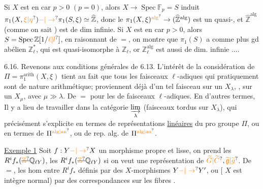 
Si $X$ est en car $p>0$ $(p=0)$, alors $X\to\operatorname{Spec}\mathbb{F}_p=S$ induit   $\pi_1(X,\unsure{\xi|\eta})\unsure{-|\to}\pi_1(S,\xi)\simeq\widehat{\mathbb{Z}}$, donc le $\pi_1(X,\xi)^{\unsure{\mathrm{alg}}}\to(\widehat{\mathbb{Z}}^{\mathrm{alg}})$ est un quasi-, et $\widehat{\mathbb{Z}}^{\mathrm{alg}}$ (comme on sait ) est de dim infinie. Si $X$ est en car $p>0$, alors  $S=\operatorname{Spec}\mathbb{Z}[1/\unsure{\ell|l}]$,  en raisonnant de $=$, on montre que $\pi_1(S)$ a  comme plus gd  abélien $\mathbb{Z}_\ell^*$, qui est quasi-isomorphe à $\mathbb{Z}_\ell$, or $\mathbb{Z}_\ell^{\mathrm{alg}}$ est aussi de dim. infinie ....

6.16. Revenons aux conditions générales de 6.13. L'intérêt de la considération de \deleted{\unsure{\(\Pi\)}} $\Pi=\pi_1^{\mathrm{arith}}(X,\xi)$ tient au fait que tous les faisceaux $\ell$-adiques  qui  pratiquement sont de nature arithmétique;  proviennent déjà d'un tel faisceau sur un $X_\lambda$,  , sur un $X_\mu$, avec $\mu\gg\lambda$.  De $=$ pour les  de faisceaux $\ell$-adiques. En d'autres termes,
Il y a lieu de travailler dans la catégorie $\underset{\lambda}{\varinjlim}$ (faisceaux  tordus sur $X_\lambda$), qui précisément s'explicite en termes de représentations \uline{linéaires}  du pro groupe $\Pi$, ou en termes de $\Pi^{\unsure{\mathrm{alg}|\mathrm{an}}}$, ou de rep. alg. de $\Pi^{\unsure{\mathrm{alg}|\mathrm{an}}}$.

\uline{Exemple 1} Soit $f:Y\unsure{-|\to}X$ un morphisme propre et lisse, on prend les $R^i f_*(\deleted{\unsure{\mathbb{Z}}}\mathbb{Q}_{\ell Y})$,   les $R^i f_*(\deleted{\unsure{\mathbb{Z}}}\mathbb{Q}_{\ell Y})$ si on veut une représentation de $\unsure{\widetilde G|\widetilde C},\unsure{\widetilde{\mathfrak g}|\widetilde g}$. De $=$, les hom entre $R^i f_*$ définis par des $X$-morphismes $Y\unsure{-|\to}Y'$, ou $[$ $X$ est intègre normal) par des  correspondances  sur les fibres .


